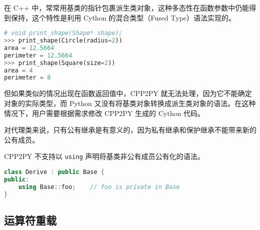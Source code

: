 在 C++ 中，常常用基类的指针包裹派生类对象，这种多态性在函数参数中仍能得到保持，这个特性是利用 Cython 的混合类型（Fused Type）语法实现的。

\begin{framed}
\begin{lstlisting}[language=python]
# void print_shape(Shape* shape);
>>> print_shape(Circle(radius=2))
area = 12.5664
perimeter = 12.5664
>>> print_shape(Square(size=2))
area = 4
perimeter = 8
\end{lstlisting}
\end{framed}

但如果类似的情况出现在函数返回值中，CPP2PY 就无法处理，因为它不能确定对象的实际类型，而 Python 又没有将基类对象转换成派生类对象的语法。在这种情况下，用户需要根据需求修改 CPP2PY 生成的 Cython 代码。

对代理类来说，只有公有继承是有意义的，因为私有继承和保护继承不能带来新的公有成员。

CPP2PY 不支持以 \lstinline{using} 声明将基类非公有成员公有化的语法。

\begin{framed}
\begin{lstlisting}[language=c++]
class Derive : public Base {
public:
    using Base::foo;	// foo is private in Base
}
\end{lstlisting}
\end{framed}

\subsection{运算符重载}

